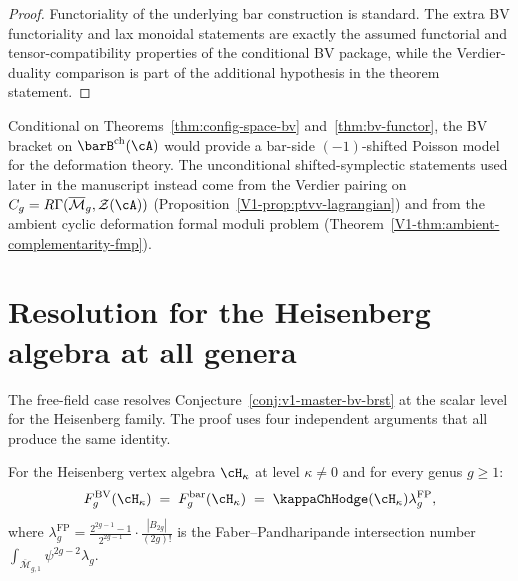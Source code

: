 \begin{proof}
Functoriality of the underlying bar construction is standard. The
extra BV functoriality and lax monoidal statements are exactly the
assumed functorial and tensor-compatibility properties of the
conditional BV package, while the Verdier-duality comparison is part
of the additional hypothesis in the theorem statement.
\end{proof}

\begin{remark}\label{rem:bv-shifted-symplectic}
Conditional on Theorems~\ref{thm:config-space-bv}
and~\ref{thm:bv-functor}, the BV bracket on
$\barB^{\mathrm{ch}}(\cA)$ would provide a bar-side
$(-1)$-shifted Poisson model for the deformation theory. The
unconditional shifted-symplectic statements used later in the
manuscript instead come from the Verdier pairing on
$C_g = R\Gamma(\overline{\mathcal{M}}_g,\mathcal{Z}(\cA))$
\textup{(}Proposition~\ref{V1-prop:ptvv-lagrangian}\textup{)} and from
the ambient cyclic deformation formal moduli problem
\textup{(}Theorem~\ref{V1-thm:ambient-complementarity-fmp}\textup{)}.
\end{remark}

\section{Resolution for the Heisenberg algebra at all genera}
\label{sec:bv-bar-heisenberg-all-genera}

The free-field case resolves
Conjecture~\ref{conj:v1-master-bv-brst} at the scalar level
for the Heisenberg family. The proof uses four independent
arguments that all produce the same identity.

\begin{theorem}[BV $=$ bar for the Heisenberg at all genera;
\ClaimStatusProvedHere]
\label{thm:heisenberg-bv-bar-all-genera}
For the Heisenberg vertex algebra $\cH_\kappa$ at level
$\kappa \neq 0$ and for every genus $g \geq 1$:
\begin{equation}\label{eq:bv-bar-heisenberg-vol2}
F_g^{\mathrm{BV}}(\cH_\kappa)
\;=\; F_g^{\mathrm{bar}}(\cH_\kappa)
\;=\; \kappaChHodge(\cH_\kappa)\lambda_g^{\mathrm{FP}},
\end{equation}
where $\lambda_g^{\mathrm{FP}}
= \frac{2^{2g-1}-1}{2^{2g-1}} \cdot
\frac{|B_{2g}|}{(2g)!}$
is the Faber--Pandharipande intersection number
$\int_{\overline{\mathcal{M}}_{g,1}} \psi^{2g-2}\lambda_g$.
\end{theorem}

